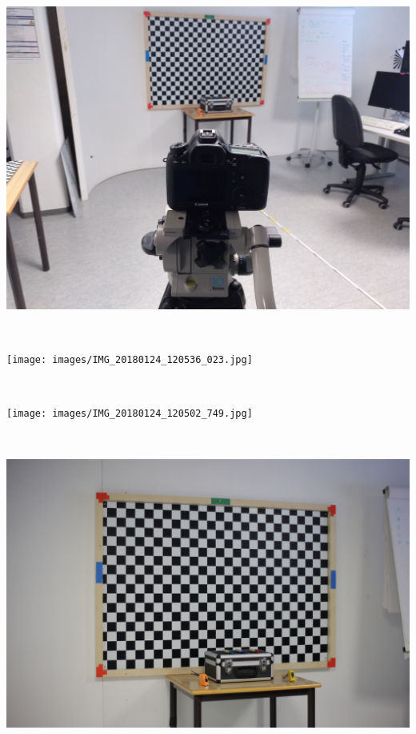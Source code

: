 	\begin{minipage}{\linewidth}
	\centering
	\includegraphics[width=.7\linewidth]{images/IMG_20180124_120523_760.jpg}
\end{minipage}\\

\begin{minipage}{\linewidth}
	\centering
	\texttt{[image: images/IMG\_20180124\_120536\_023.jpg]}
\end{minipage}\\

\begin{minipage}{\linewidth}
	\centering
	\texttt{[image: images/IMG\_20180124\_120502\_749.jpg]}
\end{minipage}\\

\begin{minipage}{\linewidth}
	\centering
	\includegraphics[width=.7\linewidth]{images/IMG_0874.jpg}
\end{minipage}\\


